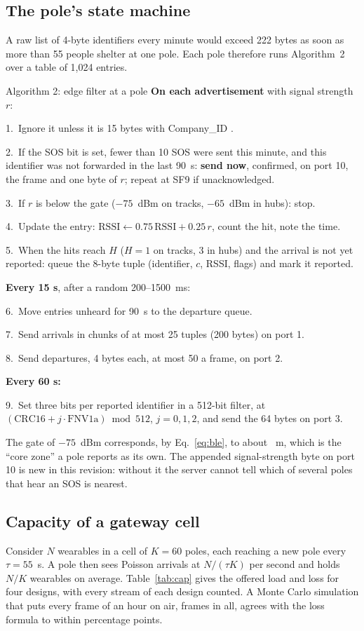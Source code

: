 \documentclass[11pt,a4paper]{article}
\begin{document}
\subsection{The pole's state machine}
A raw list of 4-byte identifiers every minute would exceed 222 bytes as soon as more than 55 people shelter at one pole.
Each pole therefore runs Algorithm~2 over a table of 1,024 entries.

\begin{algo}{Algorithm 2: edge filter at a pole}
\textbf{On each advertisement} with signal strength $r$:\par
1.\ Ignore it unless it is 15 bytes with Company\_ID .\par
2.\ If the SOS bit is set, fewer than 10 SOS were sent this minute, and this identifier was not forwarded in the last
90~s: \textbf{send now}, confirmed, on port 10, the frame and one byte of $r$; repeat at SF9 if unacknowledged.\par
3.\ If $r$ is below the gate ($-75$~dBm on tracks, $-65$~dBm in hubs): stop.\par
4.\ Update the entry: $\mathrm{RSSI}\leftarrow0.75\,\mathrm{RSSI}+0.25\,r$, count the hit, note the time.\par
5.\ When the hits reach $H$ ($H=1$ on tracks, $3$ in hubs) and the arrival is not yet reported: queue the 8-byte tuple
(identifier, $c$, RSSI, flags) and mark it reported.\par
\textbf{Every 15 s}, after a random 200--1500~ms:\par
6.\ Move entries unheard for 90~s to the departure queue.\par
7.\ Send arrivals in chunks of at most 25 tuples (200 bytes) on port 1.\par
8.\ Send departures, 4 bytes each, at most 50 a frame, on port 2.\par
\textbf{Every 60 s:}\par
9.\ Set three bits per reported identifier in a 512-bit filter, at $(\mathrm{CRC16}+j\cdot\mathrm{FNV1a})\bmod512$,
$j=0,1,2$, and send the 64 bytes on port 3.
\end{algo}

The gate of $-75$~dBm corresponds, by Eq.~\ref{eq:ble}, to about \GateTrackM~m, which is the ``core zone'' a pole
reports as its own. The appended signal-strength byte on port 10 is new in this revision: without it the server cannot
tell which of several poles that hear an SOS is nearest.

\subsection{Capacity of a gateway cell}
Consider $N$ wearables in a cell of $K=60$ poles, each reaching a new pole every $\tau=55$~s. A pole then sees Poisson
arrivals at $N/(\tau K)$ per second and holds $N/K$ wearables on average. Table~\ref{tab:cap} gives the offered load
and loss for four designs, with every stream of each design counted. A Monte Carlo simulation that puts every frame of
an hour on air, \McFrames{} frames in all, agrees with the loss formula to within \McErr{} percentage points.
\end{document}
